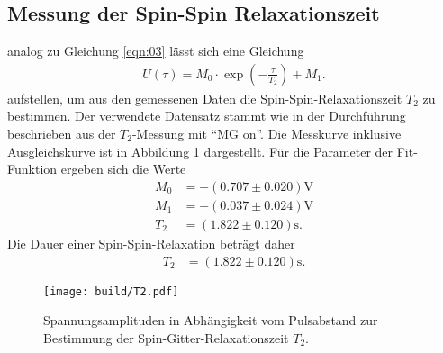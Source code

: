 \subsection{Messung der Spin-Spin Relaxationszeit}
\noindent analog zu Gleichung \ref{eqn:03} lässt sich eine Gleichung
\begin{align}
  U(\tau) = M_0 \cdot \exp{\left(- \frac{\tau}{T_2}\right)} + M_1.
  \label{eqn:04}
\end{align}
\noindent aufstellen, um aus den gemessenen Daten die
Spin-Spin-Relaxationszeit $T_2$ zu bestimmen. Der verwendete Datensatz stammt
wie in der Durchführung beschrieben aus der $T_2$-Messung mit \enquote{MG on}.
Die Messkurve inklusive Ausgleichskurve ist in Abbildung \ref{fig:02}
dargestellt. Für die Parameter der Fit-Funktion ergeben sich die Werte
\begin{align*}
  M_0 &=  -(0.707  \pm  0.020) \si{\volt} \\
  M_1 &=  -(0.037  \pm  0.024) \si{\volt} \\
  T_2 &=  (1.822  \pm  0.120) \si{\second}.
\end{align*}
\noindent Die Dauer einer Spin-Spin-Relaxation beträgt daher
\begin{align*}
    T_2 &=  (1.822  \pm  0.120) \si{\second}.
\end{align*}
\FloatBarrier
\begin{figure}
  \texttt{[image: build/T2.pdf]}
  \caption{Spannungsamplituden in Abhängigkeit vom Pulsabstand zur Bestimmung
           der Spin-Gitter-Relaxationszeit $T_2$.}
  \label{fig:02}
\end{figure}
\FloatBarrier
